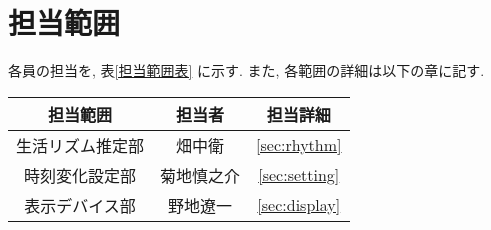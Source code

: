\section{担当範囲}

各員の担当を, 表\ref{担当範囲表} に示す.  
また, 各範囲の詳細は以下の章に記す. 

\begin{table*}[h]
	\centering
 	\begin{tabular}{|c|c|c|} \hline
		担当範囲 & 担当者 & 担当詳細 \\ \hline
		生活リズム推定部 & 畑中衛 & \ref{sec:rhythm} \\ \hline
		時刻変化設定部 & 菊地慎之介 & \ref{sec:setting} \\ \hline
		表示デバイス部 & 野地遼一 & \ref{sec:display} \\ \hline
 	\end{tabular}
	\caption{担当範囲表}
	\label{担当範囲表}
\end{table*}
